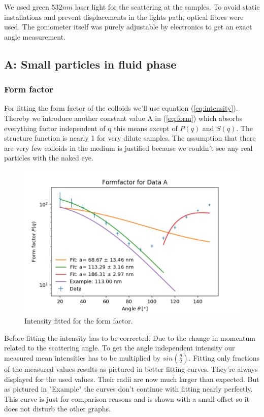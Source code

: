 \documentclass[]{article}
\begin{document}
We used green $532nm$ laser light for the scattering at the samples. To avoid static installations and prevent displacements in the lights path, optical fibres were used. The goniometer itself was purely adjustable by electronics to get an exact angle measurement.


\subsection{A: Small particles in fluid phase}
\subsubsection{Form factor}

For fitting the form factor of the colloids we'll use equation (\ref{eq:intensity}). Thereby we introduce another constant value A in (\ref{eq:form}) which absorbs everything factor independent of q this means except of $P(q)$ and $S(q)$. The structure function is nearly 1 for very dilute samples. The assumption that there are very few colloids in the medium is justified because we couldn't see any real particles with the naked eye. 

\begin{figure}[!htbp]
\centering
\includegraphics[width=0.8\linewidth]{Plots/FormA.png}
\caption{Intensity fitted for the form factor.}
\label{FormA}
\end{figure}

Before fitting the intensity has to be corrected. Due to the change in momentum related to the scattering angle. To get the angle independent intensity our measured mean intensities has to be multiplied by $sin(\frac{\theta}{2} )$.
Fitting only fractions of the measured values results as pictured in better fitting curves. They're always displayed for the used values. Their radii are now much larger than expected. But as pictured in "Example" the curves don't continue with fitting nearly perfectly. This curve is just for comparison reasons and is shown with a small offset so it does not disturb the other graphs.
\end{document}
